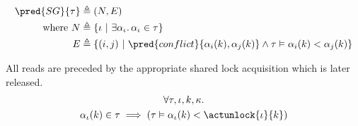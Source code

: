 \begin{align*}
\pred{SG}{\tau} &\triangleq (N, E) \\
\text{where } N &\triangleq \{ \iota\ |\ \exists \alpha_\iota \ldotp \alpha_\iota \in \tau \} \\
E &\triangleq \{ (i, j)\ |\ \pred{conflict}{\alpha_i(k), \alpha_j(k)} \land \tau \vDash \alpha_i(k) < \alpha_j(k) \}
\end{align*}

\lem \label{lem:unlock} All reads are preceded by the appropriate shared lock acquisition which is later released.
\begin{gather*}
\forall \tau, \iota, k, \kappa \ldotp \\
\alpha_\iota(k) \in \tau \implies \left( \tau \vDash \alpha_\iota(k) < \actunlock{\iota}{k} \right)
\end{gather*}

